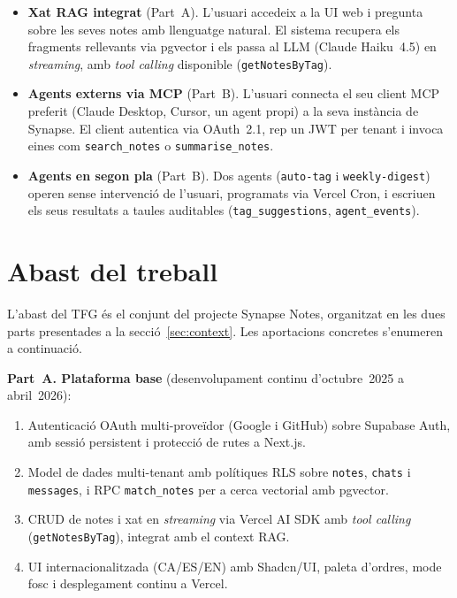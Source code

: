 \begin{itemize}
  \item \textbf{Xat RAG integrat} (Part~A). L'usuari accedeix a la UI
    web i pregunta sobre les seves notes amb llenguatge natural. El
    sistema recupera els fragments rellevants via pgvector i els passa
    al LLM (Claude Haiku~4.5) en \emph{streaming}, amb \emph{tool
    calling} disponible (\texttt{getNotesByTag}).

  \item \textbf{Agents externs via MCP} (Part~B). L'usuari connecta
    el seu client MCP preferit (Claude Desktop, Cursor, un agent propi)
    a la seva instància de Synapse. El client autentica via OAuth~2.1,
    rep un JWT per tenant i invoca eines com \texttt{search\_notes} o
    \texttt{summarise\_notes}.

  \item \textbf{Agents en segon pla} (Part~B). Dos agents
    (\texttt{auto-tag} i \texttt{weekly-digest}) operen sense
    intervenció de l'usuari, programats via Vercel Cron, i
    escriuen els seus resultats a taules auditables
    (\texttt{tag\_suggestions}, \texttt{agent\_events}).
\end{itemize}

\section{Abast del treball}
\label{sec:abast}

L'abast del TFG és el conjunt del projecte Synapse Notes, organitzat en
les dues parts presentades a la secció~\ref{sec:context}. Les
aportacions concretes s'enumeren a continuació.

\textbf{Part~A. Plataforma base} (desenvolupament continu d'octubre~2025
a abril~2026):

\begin{enumerate}
  \item Autenticació OAuth multi-proveïdor (Google i GitHub) sobre
    Supabase Auth, amb sessió persistent i protecció de rutes a
    Next.js.
  \item Model de dades multi-tenant amb polítiques RLS sobre
    \texttt{notes}, \texttt{chats} i \texttt{messages}, i RPC
    \texttt{match\_notes} per a cerca vectorial amb pgvector.
  \item CRUD de notes i xat en \emph{streaming} via Vercel AI SDK amb
    \emph{tool calling} (\texttt{getNotesByTag}), integrat amb el
    context RAG.
  \item UI internacionalitzada (CA/ES/EN) amb Shadcn/UI, paleta
    d'ordres, mode fosc i desplegament continu a Vercel.
\end{enumerate}

